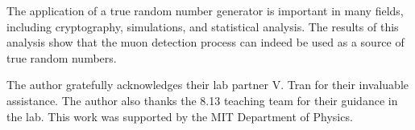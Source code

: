 The application of a true random number generator is important in many fields, including cryptography, simulations, and statistical analysis. The results of this analysis show that the muon detection process can indeed be used as a source of true random numbers. 



\begin{acknowledgments} The author gratefully acknowledges their lab partner V. Tran for their invaluable assistance. The author also thanks the 8.13 teaching team for their guidance in the lab. This work was supported by the MIT Department of Physics. 
\end{acknowledgments}





